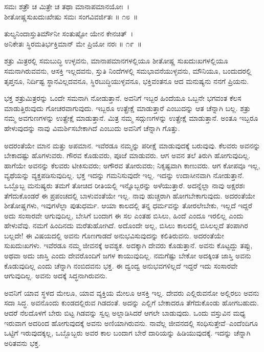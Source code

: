\begin{shloka}
ಸಮಃ ಶತ್ರೌ ಚ ಮಿತ್ರೇ ಚ ತಥಾ ಮಾನಾಪಮಾನಯೋಃ~।\\ಶೀತೋಷ್ಣಸುಖದುಃಖೇಷು ಸಮಃ ಸಂಗವಿವರ್ಜಿತಃ \hfill॥ ೧೮~॥
\end{shloka}

\begin{shloka}
ತುಲ್ಯನಿಂದಾಸ್ತುತಿರ್ಮೌನೀ ಸಂತುಷ್ಟೋ ಯೇನ ಕೇನಚಿತ್~।\\ಅನಿಕೇತಃ ಸ್ಥಿರಮತಿರ್ಭಕ್ತಿಮಾನ್ ಮೇ ಪ್ರಿಯೋ ನರಃ \hfill॥ ೧೯~॥
\end{shloka}

\begin{artha}
ಶತ್ರು ಮಿತ್ರರಲ್ಲಿ ಸಮಬುದ್ಧಿ ಉಳ್ಳವನು, ಮಾನಾಪಮಾನಗಳಲ್ಲಿಯೂ ಶೀತೋಷ್ಣ ಸುಖದುಃಖ\-ಗಳಲ್ಲಿಯೂ ಸಮನಾಗಿರುವವನು, ಆಸಕ್ತಿ ಇಲ್ಲದವನು, ಸ್ತುತಿ ನಿಂದೆಗಳಲ್ಲಿ ಸಮಭಾವನೆಯುಳ್ಳ\-ವನು, ಮೌನಿಯೂ, ಬಂದುದರಲ್ಲಿ ತೃಪ್ತನೂ, ನಿರ್ದಿಷ್ಟ ಸ್ಥಾನವಿಲ್ಲದವನೂ, ಸ್ಥಿರಬುದ್ಧಿಯುಳ್ಳವನೂ, ಭಕ್ತಿವಂತನೂ ಆದ ಮನುಷ್ಯನು ನನಗೆ ಪ್ರಿಯನು.
\end{artha}

ಭಕ್ತ ಶತ್ರುಮಿತ್ರರನ್ನು ಒಂದೇ ಸಮನಾಗಿ ನೋಡುತ್ತಾನೆ. ಅವನಿಗೆ ಇಬ್ಬರ ಹಿಂದೆಯೂ ಒಬ್ಬನೇ ಭಗವಂತ ಕೆಲಸ ಮಾಡುತ್ತಿರುವುದು ಗೋಚರವಾಗುವುದು. ಇಬ್ಬರೂ ಉತ್ಪ್ರೇಕ್ಷೆ ಮಾಡು\-ತ್ತಾರೆ ಎಂಬುದನ್ನು ಆತ ಚೆನ್ನಾಗಿ ಬಲ್ಲ. ಶತ್ರು ನಮ್ಮ ಅವಗುಣಗಳನ್ನು ಉತ್ಪ್ರೇಕ್ಷೆ ಮಾಡುತ್ತಾನೆ. ಮಿತ್ರ ನಮ್ಮ ಸದ್ಗುಣಗಳನ್ನು ಉತ್ಪ್ರೇಕ್ಷೆ ಮಾಡುತ್ತಾನೆ. ಅಂತೂ ಇಬ್ಬರೂ ಹೇಳುವುದನ್ನು ನಾವು ವಿಮರ್ಶಿಸಬೇಕಾಗಿದೆ ಎಂಬುದು ಅವನಿಗೆ ಚೆನ್ನಾಗಿ ಗೊತ್ತು.

ಅದರಂತೆಯೇ ಮಾನ ಮತ್ತು ಅಪಮಾನ. ಇವೆರಡೂ ನಮ್ಮನ್ನು ಪರೀಕ್ಷೆ ಮಾಡುವುದಕ್ಕೆ ಬರುವುವು. ಕೆಲವರು ಅವನನ್ನು ಬೇಕಾದಷ್ಟು ಹೊಗಳುವರು. ಗೌರವ ಕೊಡುವರು, ಪೂಜೆ ಮಾಡುವರು. ಆಗ ಅವನ ತಲೆ ತಿರುಗಿ ಹೋಗುವುದಿಲ್ಲ. ಹಾಗೆಯೇ ಅವನನ್ನು ಕೆಲವರು ಟೀಕಿಸುವರು; ಅಗೌರವ ತೋರುವರು; ನಿಕೃಷ್ಟವಾಗಿ ಕಾಣುವರು. ಆಗ ಕೋಪವೂ ಇಲ್ಲ, ವ್ಯಥೆಯನ್ನು ವ್ಯಕ್ತಪಡಿಸುವುದಿಲ್ಲ. ಭಕ್ತ ಇದನ್ನು ಗಮನಿಸುವುದೇ ಇಲ್ಲ. ಇದನ್ನು ಉದಾಸೀನವಾಗಿ ನೋಡುತ್ತಾನೆ. ಒಬ್ಬೊಬ್ಬ ಮನುಷ್ಯರು ತಮಗೆ ತೋಚಿದ ರೀತಿಯಲ್ಲಿ ಇನ್ನೊಬ್ಬರನ್ನು ಅಳೆಯುತ್ತಾರೆ. ಅದನ್ನೆಲ್ಲಾ ನಾವು ಅಕ್ಷರಶಃ ತೆಗೆದುಕೊಂಡರೆ ಈ ಪ್ರಪಂಚದಲ್ಲಿ ಬಾಳುವಂತೆಯೇ ಇಲ್ಲ. ನಾವು ಹುಚ್ಚರಾಗಿ ಹೋಗಬೇಕಾಗುವುದು. ಅದರಂತೆಯೇ ಶೀತೋಷ್ಣಗಳು, ಇವುಗಳೆಲ್ಲಾ ಪುತುಧರ್ಮ. ಆಯಾ ಕಾಲದಲ್ಲಿ ತನ್ನ ಧರ್ಮವನ್ನು ತೋರಲೇಬೇಕು, ಇಲ್ಲದೆ ಇದ್ದರೆ ಅದು ಸಂಸಾರವೇ ಆಗುವುದಿಲ್ಲ, ಬೇಸಿಗೆ ಬಂದಾಗ ಈ ಸಲ ಎಂತಹ ಬಿಸಿಲು, ಹಿಂದೆ ಎಂದೂ ಇರಲಿಲ್ಲ ಎಂದು ಹೇಳುವೆವು. ನಮಗೆ ಹಿಂದಿನದು ಮರೆತುಹೋಗಿದೆ. ಅದೊಂದೇ ಅಲ್ಲ, ಬಿಸಿಲು ಕಾಲದಲ್ಲಿ ಬಿಸಿಲಲ್ಲದೆ ತಂಪಾಗಿರ ಬಲ್ಲದೇ! ಈ ವಿಷಯದಲ್ಲಿ ಅವನು ಗೊಣಗಾಡದೆ ಅನುಭವಿಸುವುದನ್ನು ಕಲಿತಿರುವನು. ಅದರಂತೆಯೇ ಸುಖದುಃಖಗಳು. ಇವೆರಡೂ ನಮ್ಮ ಜೀವನಕ್ಕೆ ಅವಶ್ಯಕ. ಅದಕ್ಕಾಗಿ ದೇವರು ಕೊಡುತ್ತಾನೆ. ಅವನು ಕೊಟ್ಟದ್ದು ತಪ್ಪು, ಅಥವಾ ಅದು ಜಾಸ್ತಿ ಎಂದು ದೇವರೊಂದಿಗೆ ಜಗಳ ಕಾಯುವುದಿಲ್ಲ. ನಮಗೆಷ್ಟು ಬೇಕೋ ಅದಕ್ಕಿಂತ ಜಾಸ್ತಿ ಅವನು ಕೊಡುವುದಿಲ್ಲ ಎಂದು ಚೆನ್ನಾಗಿ ನಂಬಿದವನು ಭಕ್ತ. ಈ ದ್ವಂದ್ವ ಅನುಭವಗಳಿಲ್ಲದೆ ಇದ್ದರೆ ಇದು ಸಂಸಾರವೇ ಆಗುವುದಿಲ್ಲ. ಅವನು ಅದಕ್ಕೆ ಸಿದ್ಧನಾಗಿರುವನು.

ಅವನಿಗೆ ಯಾವ ಸ್ಥಳದ ಮೇಲೂ, ಯಾವ ವ್ಯಕ್ತಿಯ ಮೇಲೂ ಆಸಕ್ತಿ ಇಲ್ಲ. ದೇವರು ಎಲ್ಲಿರುವನೋ ಅಲ್ಲಿರಲು ಅವನು ಸದಾ ಸಿದ್ಧ. ಅವನೊಂದು ಕುಂಡದಲ್ಲಿರುವ ಗಿಡದಂತೆ. ಅದನ್ನು ಎಲ್ಲಿಗೆ ಬೇಕಾದರೂ ತೆಗೆದುಕೊಂಡು ಹೋಗಬಹುದು. ಆದರೆ ನೆಲದೊಳಗೆ ಬೇರು ಬಿಟ್ಟ ಗಿಡವನ್ನು ಸ್ವಲ್ಪ ಅಲ್ಲಾಡಿಸಿದರೆ ಆಗಲೇ ಬಾಡುವುದು. ಒಂದು ವಸ್ತುವಿನ ಮಧ್ಯ ಇರುವಾಗ ಅದರಿಂದ ಹೋಗುವುದಕ್ಕೆ ಅವನು ಅಣಿಯಾಗಿರುವನು. ನಾವೆಲ್ಲ ಜೀವನದಲ್ಲಿ ಸಂಧಿಸುತ್ತೇವೆ–ಎಂದೆಂದಿಗೂ ಒಟ್ಟಿಗೆ ಇರುವುದಕ್ಕಲ್ಲ, ಒಬ್ಬೊಬ್ಬರು ಅವರ ಕಾಲ ಬಂದಾಗ ಬೇರೆ ದಾರಿಯನ್ನು ಹಿಡಿಯುವುದಕ್ಕೆ. ಇದನ್ನು ಚೆನ್ನಾಗಿ ಅರಿತವನು ಭಕ್ತ. 

